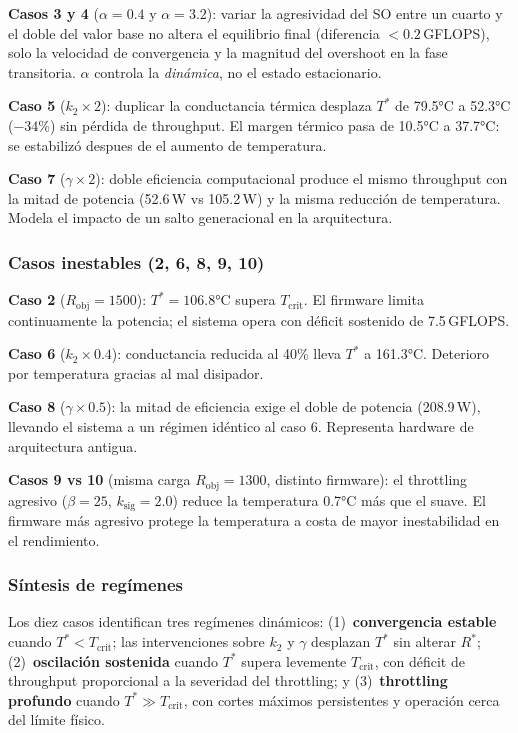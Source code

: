 \documentclass[10pt, twocolumn]{article}
\begin{document}
\textbf{Casos 3 y 4} ($\alpha=0.4$ y $\alpha=3.2$): variar la
agresividad del SO entre un cuarto y el doble del valor base
no altera el equilibrio final (diferencia $< 0.2$\,GFLOPS), solo la
velocidad de convergencia y la magnitud del overshoot en la fase
transitoria. $\alpha$ controla la \emph{dinámica}, no el estado estacionario.

\textbf{Caso 5} ($k_2 \times 2$): duplicar la conductancia térmica
desplaza $T^*$ de 79.5°C a 52.3°C ($-34$\%) sin pérdida de throughput.
El margen térmico pasa de 10.5°C a 37.7°C: se estabilizó despues de el aumento de temperatura.

\textbf{Caso 7} ($\gamma \times 2$): doble eficiencia computacional
produce el mismo throughput con la mitad de potencia (52.6\,W vs
105.2\,W) y la misma reducción de temperatura. Modela el impacto de
un salto generacional en la arquitectura.

\subsubsection*{Casos inestables (2, 6, 8, 9, 10)}

\textbf{Caso 2} ($R_\text{obj}=1500$): $T^*=106.8$°C supera
$T_\text{crit}$. El firmware limita continuamente la potencia; el
sistema opera con déficit sostenido de 7.5\,GFLOPS.

\textbf{Caso 6} ($k_2 \times 0.4$): conductancia reducida al 40\%
lleva $T^*$ a 161.3°C. Deterioro por temperatura gracias al mal disipador.

\textbf{Caso 8} ($\gamma \times 0.5$): la mitad de eficiencia exige
el doble de potencia (208.9\,W), llevando el sistema a un régimen
idéntico al caso 6. Representa hardware de arquitectura antigua.

\textbf{Casos 9 vs 10} (misma carga $R_\text{obj}=1300$, distinto
firmware): el throttling agresivo ($\beta=25$, $k_\text{sig}=2.0$)
reduce la temperatura 0.7°C más que el suave. El firmware más agresivo protege la temperatura a
costa de mayor inestabilidad en el rendimiento.

\subsubsection*{Síntesis de regímenes}

Los diez casos identifican tres regímenes dinámicos: (1)~\textbf{convergencia
estable} cuando $T^* < T_\text{crit}$; las intervenciones sobre $k_2$
y $\gamma$ desplazan $T^*$ sin alterar $R^*$; (2)~\textbf{oscilación
sostenida} cuando $T^*$ supera levemente $T_\text{crit}$, con déficit
de throughput proporcional a la severidad del throttling; y
(3)~\textbf{throttling profundo} cuando $T^* \gg T_\text{crit}$,
con cortes máximos persistentes y operación cerca del límite físico.
\end{document}

